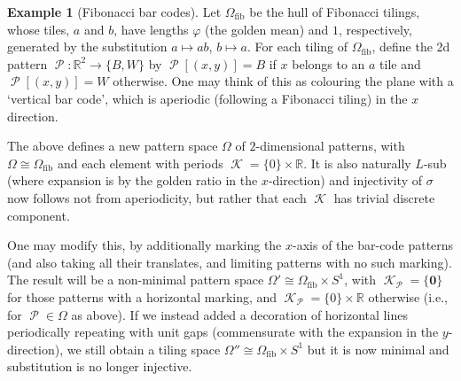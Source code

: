 \documentclass[11pt]{amsart}
\numberwithin{equation}{section}
\theoremstyle{plain}
\theoremstyle{definition}
\newtheorem{example}[theorem]{Example}
\newcommand{\R}{\mathbb R}
\newcommand{\sub}{\sigma}
\DeclareMathOperator{\cP}{\mathcal{P}}
\DeclareMathOperator{\cK}{\mathcal{K}}
\begin{document}
\begin{example}[Fibonacci bar codes]\label{exp:Fibonacci bar code}
Let \(\Omega_\mathrm{fib}\) be the hull of Fibonacci tilings, whose tiles, \(a\) and \(b\), have lengths \(\varphi\) (the golden mean) and \(1\), respectively, generated by the substitution \(a \mapsto ab\), \(b \mapsto a\). For each tiling of \(\Omega_\mathrm{fib}\), define the 2d pattern \(\cP \colon \R^2 \to \{B,W\}\) by \(\cP[(x,y)] = B\) if \(x\) belongs to an \(a\) tile and \(\cP[(x,y)] = W\) otherwise. One may think of this as colouring the plane with a `vertical bar code', which is aperiodic (following a Fibonacci tiling) in the \(x\) direction.

The above defines a new pattern space \(\Omega\) of \(2\)-dimensional patterns, with \(\Omega \cong \Omega_\mathrm{fib}\) and each element with periods \(\cK = \{0\} \times \R\). It is also naturally \(L\)-sub (where expansion is by the golden ratio in the \(x\)-direction) and injectivity of \(\sub\) now follows not from aperiodicity, but rather that each \(\cK\) has trivial discrete component.

One may modify this, by additionally marking the \(x\)-axis of the bar-code patterns (and also taking all their translates, and limiting patterns with no such marking). The result will be a non-minimal pattern space \(\Omega' \cong \Omega_\mathrm{fib} \times S^1\), with \(\cK_{\cP} = \{\mathbf{0}\}\) for those patterns with a horizontal marking, and \(\cK_{\cP} = \{0\} \times \R\) otherwise (i.e., for \(\cP \in \Omega\) as above). If we instead added a decoration of horizontal lines periodically repeating with unit gaps (commensurate with the expansion in the \(y\)-direction), we still obtain a tiling space \(\Omega'' \cong \Omega_\mathrm{fib} \times S^1\) but it is now minimal and substitution is no longer injective.
\end{example}
\end{document}
